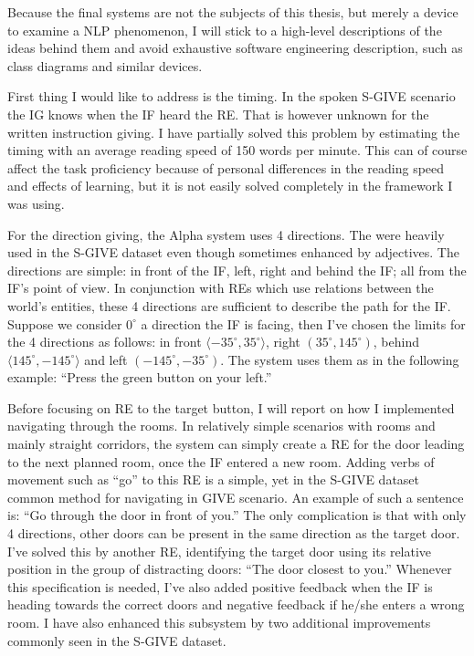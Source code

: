 Because the final systems are not the subjects of this thesis, but merely a device to examine a NLP phenomenon, I will stick to a high-level descriptions of the ideas behind them and avoid exhaustive software engineering description, such as class diagrams and similar devices.

First thing I would like to address is the timing. In the spoken S-GIVE scenario the IG knows when the IF heard the RE. That is however unknown for the written instruction giving. I have partially solved this problem by estimating the timing with an average reading speed of 150 words per minute. This can of course affect the task proficiency because of personal differences in the reading speed and effects of learning, but it is not easily solved completely in the framework I was using.

For the direction giving, the Alpha system uses 4 directions. The were heavily used in the S-GIVE dataset even though sometimes enhanced by adjectives. The directions are simple: in front of the IF, left, right and behind the IF; all from the IF's point of view. In conjunction with REs which use relations between the world's entities, these 4 directions are sufficient to describe the path for the IF. Suppose we consider $0^{\circ}$ a direction the IF is facing, then I've chosen the limits for the 4 directions as follows: in front $\langle-35^{\circ},35^{\circ}\rangle$, right $(35^{\circ},145^{\circ})$, behind $\langle145^{\circ},-145^{\circ}\rangle$ and left $(-145^{\circ},-35^{\circ})$. The system uses them as in the following example: ``Press the green button on your left.''

Before focusing on RE to the target button, I will report on how I implemented navigating through the rooms. In relatively simple scenarios with rooms and mainly straight corridors, the system can simply create a RE for the door leading to the next planned room, once the IF entered a new room. Adding verbs of movement such as ``go'' to this RE is a simple, yet in the S-GIVE dataset common method for navigating in GIVE scenario. An example of such a sentence is: ``Go through the door in front of you.'' The only complication is that with only 4 directions, other doors can be present in the same direction as the target door. I've solved this by another RE, identifying the target door using its relative position in the group of distracting doors: ``The door closest to you.'' Whenever this specification is needed, I've also added positive feedback when the IF is heading towards the correct doors and negative feedback if he/she enters a wrong room. I have also enhanced this subsystem by two additional improvements commonly seen in the S-GIVE dataset.

